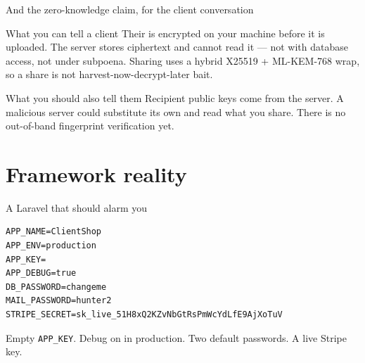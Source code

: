\documentclass[aspectratio=169,10pt]{beamer}
\begin{document}
\begin{frame}{And the zero-knowledge claim, for the client conversation}
  \small
  \begin{block}{What you can tell a client}
    Their  is encrypted on your machine before it is uploaded. The
    server stores ciphertext and cannot read it --- not with database access,
    not under subpoena. Sharing uses a hybrid X25519 + ML-KEM-768 wrap, so a
    share is not harvest-now-decrypt-later bait.
  \end{block}

  \vspace{0.6em}
  \begin{block}{What you should also tell them}
    Recipient public keys come from the server. A malicious server could
    substitute its own and read what you share. There is no out-of-band
    fingerprint verification yet.
  \end{block}

  \vspace{0.5em}
\end{frame}

\section{Framework reality}

\begin{frame}[fragile]{A Laravel  that should alarm you}
\begin{lstlisting}[style=evnxcode]
APP_NAME=ClientShop
APP_ENV=production
APP_KEY=
APP_DEBUG=true
DB_PASSWORD=changeme
MAIL_PASSWORD=hunter2
STRIPE_SECRET=sk_live_51H8xQ2KZvNbGtRsPmWcYdLfE9AjXoTuV
\end{lstlisting}

  \vspace{0.5em}
  Empty \texttt{APP\_KEY}. Debug on in production. Two default passwords. A
  live Stripe key.

  \vspace{0.6em}
\end{frame}

\begin{frame}[fragile]{}
\end{frame}
\end{document}

